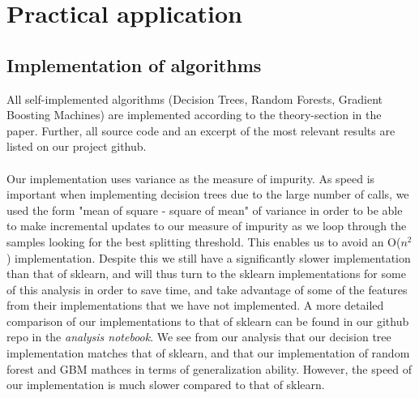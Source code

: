 \documentclass[10pt, a4paper, twocolumn]{article}
\begin{document}
\section{Practical application}
	\subsection{Implementation of algorithms}
		All self-implemented algorithms (Decision Trees, Random Forests, Gradient Boosting Machines) are implemented according to the theory-section in the paper. Further, all source code and an excerpt of the most relevant results are listed on our project github\cite{GithubRepo}.\\\\
		Our implementation uses variance as the measure of impurity. As speed is important when implementing decision trees due to the large number of calls, we used the form "mean of square - square of mean" of variance in order to be able to make incremental updates to our measure of impurity as we loop through the samples looking for the best splitting threshold. This enables us to avoid an O($n^2$) implementation. Despite this we still have a significantly slower implementation than that of sklearn, and will thus turn to the sklearn implementations for some of this analysis in order to save time, and take advantage of some of the features from their implementations that we have not implemented. A more detailed comparison of our implementations to that of sklearn can be found in our github repo in the \emph{analysis notebook}. We see from our analysis that our decision tree implementation matches that of sklearn, and that our implementation of random forest and GBM mathces in terms of generalization ability. However, the speed of our implementation is much slower compared to that of sklearn.
\end{document}
